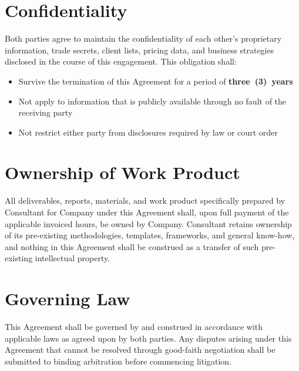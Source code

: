 \documentclass{toospoint}
\begin{document}
\section{Confidentiality}

Both parties agree to maintain the confidentiality of each other's proprietary
information, trade secrets, client lists, pricing data, and business strategies
disclosed in the course of this engagement. This obligation shall:

\begin{itemize}[leftmargin=1.5em, itemsep=4pt, topsep=4pt]
  \item Survive the termination of this Agreement for a period of \textbf{three~(3)~years}
  \item Not apply to information that is publicly available through no fault of the
        receiving party
  \item Not restrict either party from disclosures required by law or court order
\end{itemize}

\section{Ownership of Work Product}

All deliverables, reports, materials, and work product specifically prepared by
Consultant for Company under this Agreement shall, upon full payment of the
applicable invoiced hours, be owned by Company. Consultant retains ownership of
its pre-existing methodologies, templates, frameworks, and general know-how, and
nothing in this Agreement shall be construed as a transfer of such pre-existing
intellectual property.

\section{Governing Law}

This Agreement shall be governed by and construed in accordance with applicable
laws as agreed upon by both parties. Any disputes arising under this Agreement that
cannot be resolved through good-faith negotiation shall be submitted to binding
arbitration before commencing litigation.

\vspace{28pt}
\end{document}
